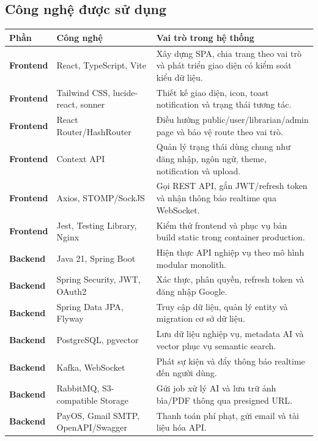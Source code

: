 \subsection{Công nghệ được sử dụng}
\label{subsec:technologies-used}
\begin{table}[H]
\centering
\small
\renewcommand{\arraystretch}{1.18}
\setlength{\tabcolsep}{4pt}
\begin{tabularx}{\linewidth}{|p{2.2cm}|p{4.1cm}|X|}
\hline
\textbf{Phần} & \textbf{Công nghệ} & \textbf{Vai trò trong hệ thống} \\
\hline
\textbf{Frontend} & React, TypeScript, Vite & Xây dựng SPA, chia trang theo vai trò và phát triển giao diện có kiểm soát kiểu dữ liệu. \\
\hline
\textbf{Frontend} & Tailwind CSS, lucide-react, sonner & Thiết kế giao diện, icon, toast notification và trạng thái tương tác. \\
\hline
\textbf{Frontend} & React Router/HashRouter & Điều hướng public/user/librarian/admin page và bảo vệ route theo vai trò. \\
\hline
\textbf{Frontend} & Context API & Quản lý trạng thái dùng chung như đăng nhập, ngôn ngữ, theme, notification và upload. \\
\hline
\textbf{Frontend} & Axios, STOMP/SockJS & Gọi REST API, gắn JWT/refresh token và nhận thông báo realtime qua WebSocket. \\
\hline
\textbf{Frontend} & Jest, Testing Library, Nginx & Kiểm thử frontend và phục vụ bản build static trong container production. \\
\hline
\textbf{Backend} & Java 21, Spring Boot & Hiện thực API nghiệp vụ theo mô hình modular monolith. \\
\hline
\textbf{Backend} & Spring Security, JWT, OAuth2 & Xác thực, phân quyền, refresh token và đăng nhập Google. \\
\hline
\textbf{Backend} & Spring Data JPA, Flyway & Truy cập dữ liệu, quản lý entity và migration cơ sở dữ liệu. \\
\hline
\textbf{Backend} & PostgreSQL, pgvector & Lưu dữ liệu nghiệp vụ, metadata AI và vector phục vụ semantic search. \\
\hline
\textbf{Backend} & Kafka, WebSocket & Phát sự kiện và đẩy thông báo realtime đến người dùng. \\
\hline
\textbf{Backend} & RabbitMQ, S3-compatible Storage & Gửi job xử lý AI và lưu trữ ảnh bìa/PDF thông qua presigned URL. \\
\hline
\textbf{Backend} & PayOS, Gmail SMTP, OpenAPI/Swagger & Thanh toán phí phạt, gửi email và tài liệu hóa API. \\

\end{tabularx}
\end{table}
